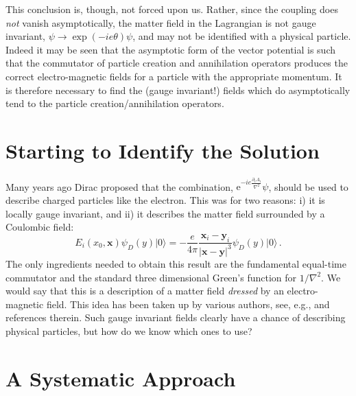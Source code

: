 \documentclass[12pt,a4paper]{article}
\newcommand{\ket}[1]{\vert #1 \rangle}
\newcommand{\psidirac}{\psi_D}
\begin{document}
This conclusion is, though, not forced upon us. Rather, since the coupling does \textit{not}
vanish asymptotically, the matter field in the Lagrangian is not gauge invariant, $\psi\to \exp(-ie\theta)\psi$,
and may not be identified with a physical particle. Indeed it may be seen that the asymptotic form of the
vector potential is such that the commutator of particle creation and annihilation operators produces the
correct electro-magnetic fields for a particle with the appropriate momentum. It is therefore necessary to find the
(gauge invariant!) fields which do asymptotically tend to the particle creation/annihilation operators.


\section*{Starting to Identify the Solution}

Many years ago Dirac\cite{Dirac:1955ca} proposed
that the combination, $\mathrm{e}^{-ie\frac{\partial_iA_i}{\nabla^2}}\psi$,
should be used to describe charged particles like the electron. This was for two reasons: i) it is locally
gauge invariant, and ii) it describes the matter field surrounded by a Coulombic field:
\begin{equation}
E_i(x_0,{\boldsymbol{x}})\psidirac(y)\ket0=
-\frac {e}{4\pi}
\frac{{\boldsymbol{x}_i-\boldsymbol{y}_i}}{\vert{\boldsymbol{x}-
\boldsymbol{y}}\vert^3}\psidirac(y)\ket0\,.
\end{equation}
The only ingredients needed to obtain this result are the fundamental equal-time commutator and the standard
three dimensional Green's function for $1/\nabla^2$. We would say that this is a description of a matter field
\textit{dressed} by an electro-magnetic field. This idea has been taken up by various authors, see, e.g.,
\cite{Lavelle:1997ty,Horan:1998im,haller:1996} and references therein.
Such gauge invariant fields clearly have a chance of describing physical particles, but how do we
know which ones to use?

\section*{A Systematic Approach}
\end{document}
